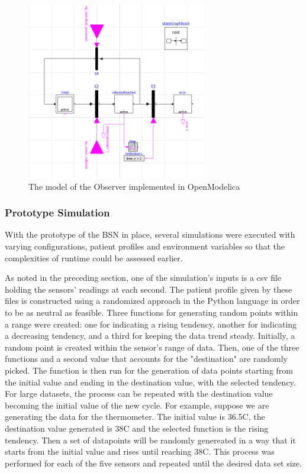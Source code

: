 \begin{figure}[!h]
	\centering
	\includegraphics[width=0.7\textwidth, keepaspectratio]{img/obs_modelica.png}
	\caption{The model of the Observer implemented in OpenModelica}
	\label{fig:obsProt}
\end{figure}

\subsubsection{Prototype Simulation}

With the prototype of the BSN in place, several simulations were executed with varying configurations, patient profiles and environment variables so that the complexities of runtime could be assessed earlier. 

As noted in the preceding section, one of the simulation's inputs is a csv file holding the sensors' readings at each second. The patient profile given by these files is constructed using a randomized approach in the Python language in order to be as neutral as feasible. Three functions for generating random points within a range were created: one for indicating a rising tendency, another for indicating a decreasing tendency, and a third for keeping the data trend steady. Initially, a random point is created within the sensor's range of data. Then, one of the three functions and a second value that accounts for the "destination" are randomly picked. The function is then run for the generation of data points starting from the initial value and ending in the destination value, with the selected tendency. For large datasets, the process can be repeated with the destination value becoming the initial value of the new cycle. For example, suppose we are generating the data for the thermometer. The initial value is 36.5C, the destination value generated is 38C and the selected function is the rising tendency. Then a set of datapoints will be randomly genereated in a way that it starts from the initial value and rises until reaching 38C. This process was performed for each of the five sensors and repeated until the desired data set size.

